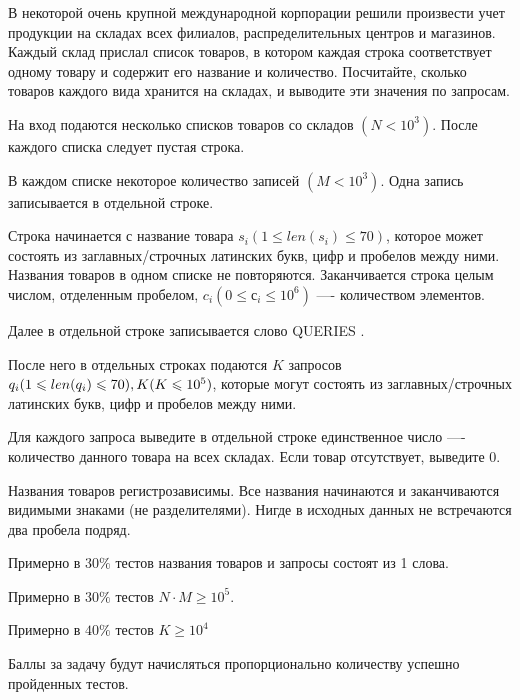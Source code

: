 
В некоторой очень крупной международной корпорации решили произвести учет продукции на складах всех филиалов, распределительных центров и магазинов. Каждый склад прислал список товаров, в котором каждая строка соответствует одному товару и содержит его название и количество. Посчитайте, сколько товаров каждого вида хранится на складах, и выводите эти значения по запросам.


На вход подаются несколько списков товаров со складов $(N < 10^3)$. После каждого списка следует пустая строка.

В каждом списке некоторое количество записей $(M < 10^3)$. Одна запись записывается в отдельной строке.

Строка начинается с название товара $ s_i (1 \leq len(s_i) \leq 70) $, которое может состоять из заглавных/строчных латинских букв, цифр и пробелов между ними. Названия товаров в одном списке не повторяются. Заканчивается строка целым числом, отделенным пробелом, $ c_i (0 \leq с_i \leq 10^6) $ —- количеством элементов. 

Далее в отдельной строке записывается слово QUERIES .

После него в отдельных строках подаются $ K $ запросов $  q_i\space (1 \leq len(q_i) \leq 70), K\space (K \leq 10^5 )$, которые могут состоять из заглавных/строчных латинских букв, цифр и пробелов между ними. 

\outputfmtSection

Для каждого запроса выведите в отдельной строке единственное число —- количество данного товара на всех складах. Если товар отсутствует, выведите $ 0 $.

\explanationSection

Названия товаров регистрозависимы. Все названия начинаются и заканчиваются видимыми знаками (не разделителями). Нигде в исходных данных не встречаются два пробела подряд.

\markSection

Примерно в $ 30\% $ тестов названия товаров и запросы состоят из 1 слова. 

Примерно в $ 30\% $ тестов $  N \cdot M \geq 10 ^ 5 $.

Примерно в $ 40\% $ тестов $ K \geq 10^4 $

Баллы за задачу будут начисляться пропорционально количеству успешно пройденных тестов.


